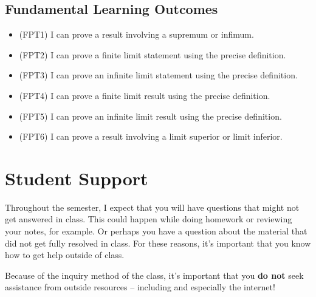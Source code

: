 \documentclass[
  letterpaper,
  DIV=11,
  numbers=noendperiod]{scrreprt}
\providecommand{\tightlist}{%
  \setlength{\itemsep}{0pt}\setlength{\parskip}{0pt}}\usepackage{longtable,booktabs,array}
\begin{document}
\section{Fundamental Learning
Outcomes}\label{fundamental-learning-outcomes}

\begin{itemize}
\tightlist
\item
  (FPT1) I can prove a result involving a supremum or infimum.
\item
  (FPT2) I can prove a finite limit statement using the precise
  definition.
\item
  (FPT3) I can prove an infinite limit statement using the precise
  definition.
\item
  (FPT4) I can prove a finite limit result using the precise definition.
\item
  (FPT5) I can prove an infinite limit result using the precise
  definition.
\item
  (FPT6) I can prove a result involving a limit superior or limit
  inferior.
\end{itemize}


\chapter{Student Support}\label{student-support}

Throughout the semester, I expect that you will have questions that
might not get answered in class. This could happen while doing homework
or reviewing your notes, for example. Or perhaps you have a question
about the material that did not get fully resolved in class. For these
reasons, it's important that you know how to get help outside of class.

\begin{tcolorbox}[enhanced jigsaw, breakable, rightrule=.15mm, left=2mm, arc=.35mm, bottomrule=.15mm, colframe=quarto-callout-warning-color-frame, toprule=.15mm, leftrule=.75mm, opacityback=0, colback=white]
\begin{minipage}[t]{5.5mm}
\textcolor{quarto-callout-warning-color}{\faExclamationTriangle}
\end{minipage}%
\begin{minipage}[t]{\textwidth - 5.5mm}

Because of the inquiry method of the class, it's important that you
\textbf{do not} seek assistance from outside resources -- including and
especially the internet!

\end{minipage}%
\end{tcolorbox}
\end{document}
